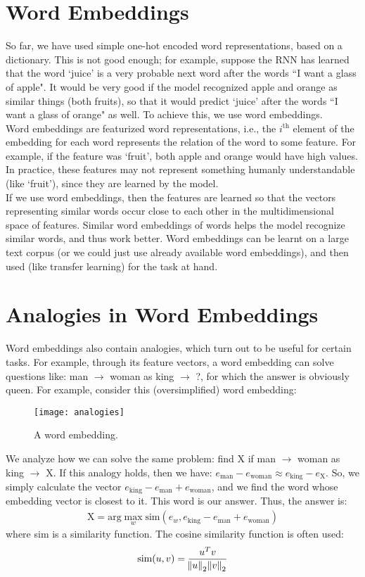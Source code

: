 \documentclass[a4paper, 12pt]{report}
\begin{document}
\section{Word Embeddings}
So far, we have used simple one-hot encoded word representations, based on a dictionary. This is not good enough; for example, suppose the RNN has learned that the word `juice' is a very probable next word after the words ``I want a glass of apple". It would be very good if the model recognized apple and orange as similar things (both fruits), so that it would predict `juice' after the words ``I want a glass of orange" as well. To achieve this, we use word embeddings.\\
\break
Word embeddings are featurized word representations, i.e., the $i^{\text{th}}$ element of the embedding for each word represents the relation of the word to some feature. For example, if the feature was `fruit', both apple and orange would have high values. In practice, these features may not represent something humanly understandable (like `fruit'), since they are learned by the model.\\
\break
If we use word embeddings, then the features are learned so that the vectors representing similar words occur close to each other in the multidimensional space of features. Similar word embeddings of words helps the model recognize similar words, and thus work better. Word embeddings can be learnt on a large text corpus (or we could just use already available word embeddings), and then used (like transfer learning) for the task at hand.

\section{Analogies in Word Embeddings}
Word embeddings also contain analogies, which turn out to be useful for certain tasks. For example, through its feature vectors, a word embedding can solve questions like: man $\rightarrow$ woman as king $\rightarrow$ ?, for which the answer is obviously queen. For example, consider this (oversimplified) word embedding:
\begin{figure}[H]
\centering
\texttt{[image: analogies]}
\caption{A word embedding.}
\end{figure}
We analyze how we can solve the same problem: find X if man $\rightarrow$ woman as king $\rightarrow$ X. If this analogy holds, then we have: $e_{\text{man}} - e_{\text{woman}} \approx e_{\text{king}} - e_{\text{X}}$. So, we simply calculate the vector $e_{\text{king}} - e_{\text{man}} + e_{\text{woman}}$, and we find the word whose embedding vector is closest to it. This word is our answer. Thus, the answer is:
\begin{align*}
\text{X} = \text{arg}\max_{w}\text{sim}\left(e_w, e_{\text{king}} - e_{\text{man}} + e_{\text{woman}}\right)
\end{align*}
where sim is a similarity function. The cosine similarity function is often used:
\begin{align*}
\text{sim}(u,v) = \dfrac{u^{T}v}{\norm{u}_2\norm{v}_2}
\end{align*}
\end{document}
